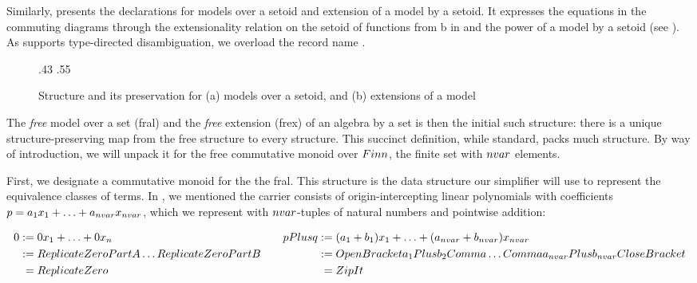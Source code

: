 Similarly,  presents the declarations
for models over a setoid and extension of a model by a setoid. It
expresses the equations in the commuting diagrams through
the extensionality relation on the setoid of functions from
b in  and the power of a
model by a setoid (see ). As \idris{}
supports type-directed disambiguation, we overload the record name
\IdrisType{($\~>$)}.

\begin{figure}
  \TwoColDIY%
      {.43}{%
        \ModelOver{}
        \PreservesEnvDecl{}
        \ModelOverHomo{}
      }
      {.55}{%
        \Extension{}
        \vspace{-.5\baselineskip}
        \ExtensionHomo{}
      }
  \caption{Structure and its preservation for (a) models
    over a setoid, and (b) extensions of a model}
\end{figure}



The \emph{free} model over a set (fral) and the \emph{free}
extension (frex) of an algebra by a set is then the initial such
structure: there is a unique structure-preserving map from the free
structure to every structure.
This succinct definition, while
standard, packs much structure. By way of introduction, we will unpack
it for the free commutative monoid over $\Finn$, the finite set with
$\nvar$ elements.

First, we designate a commutative monoid for the
the fral. This structure is the data structure our simplifier will use
to represent the equivalence classes of terms.
In , we mentioned the
carrier consists of origin-intercepting linear polynomials with \Nat{}
coefficients $p = a_1x_1 + \ldots + a_{\nvar}x_{\nvar}$, which we
represent with $\nvar$-tuples of natural numbers and pointwise addition:
\begin{center}
\begin{minipage}{.35\textwidth}
  \ModelCarrier{}
\end{minipage}
\begin{minipage}{.6\textwidth}
  \[
  \begin{aligned}[t]
    0 \definedby{}& 0x_1 +\ldots+0x_n & \quad p \Plus q \definedby{}& (a_1 + b_1)x_1 + \ldots + (a_{\nvar} + b_{\nvar})x_{\nvar} \\
    \definedby{}& \ReplicateZeroPartA \ldots \ReplicateZeroPartB
    & \definedby{}& \OpenBracket a_1 \Plus b_2 \Comma \ldots \Comma a_{\nvar} \Plus b_{\nvar} \CloseBracket
    \\
    ={}& \ReplicateZero & ={}& \ZipIt{}
  \end{aligned}
  \]
\end{minipage}
\end{center}

